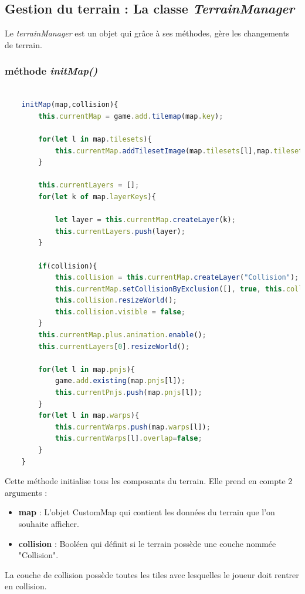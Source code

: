 \documentclass[11pt]{article}
\begin{document}
\begin{appendices}
\subsection{Gestion du terrain : La classe \textit{TerrainManager}}
Le \textit{terrainManager} est un objet qui grâce à ses méthodes, gère les changements de terrain.
\subsubsection{méthode \textit{initMap()}}
\begin{lstlisting}[language=JavaScript]

    initMap(map,collision){ 
        this.currentMap = game.add.tilemap(map.key);

        for(let l in map.tilesets){
            this.currentMap.addTilesetImage(map.tilesets[l],map.tilesets[l]); 
        }

        this.currentLayers = [];
        for(let k of map.layerKeys){

            let layer = this.currentMap.createLayer(k);
            this.currentLayers.push(layer);
        }

        if(collision){
            this.collision = this.currentMap.createLayer("Collision");
            this.currentMap.setCollisionByExclusion([], true, this.collision);
            this.collision.resizeWorld();
            this.collision.visible = false;
        }
        this.currentMap.plus.animation.enable();
        this.currentLayers[0].resizeWorld();

        for(let l in map.pnjs){
            game.add.existing(map.pnjs[l]);
            this.currentPnjs.push(map.pnjs[l]);
        }
        for(let l in map.warps){
            this.currentWarps.push(map.warps[l]);
            this.currentWarps[l].overlap=false;
        }
    }
\end{lstlisting} 
Cette méthode initialise tous les composants du terrain. Elle prend en compte 2 arguments :
\begin{itemize}
\item \textbf{map} : L'objet CustomMap qui contient les données du terrain que l'on souhaite afficher. 
\item \textbf{collision} : Booléen qui définit si le terrain possède une couche nommée "Collision".
\end{itemize}
La couche de collision possède toutes les tiles avec lesquelles le joueur doit rentrer en collision. \\


\end{appendices}
\end{document}

